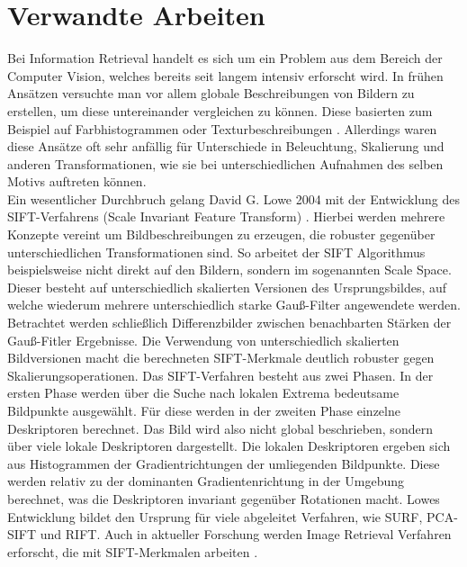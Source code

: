 \section*{Verwandte Arbeiten}
Bei Information Retrieval handelt es sich um ein Problem aus dem Bereich der Computer Vision, welches bereits seit langem intensiv erforscht wird. In frühen Ansätzen versuchte man vor allem globale Beschreibungen von Bildern zu erstellen, um diese untereinander vergleichen zu können. Diese basierten zum Beispiel auf Farbhistogrammen oder Texturbeschreibungen \cite{early_days}. Allerdings waren diese Ansätze oft sehr anfällig für Unterschiede in Beleuchtung, Skalierung und anderen Transformationen, wie sie bei unterschiedlichen Aufnahmen des selben Motivs auftreten können.
\\
Ein wesentlicher Durchbruch gelang David G. Lowe 2004 mit der Entwicklung des SIFT-Verfahrens (Scale Invariant Feature Transform) \cite{sift}. Hierbei werden mehrere Konzepte vereint um Bildbeschreibungen zu erzeugen, die robuster gegenüber unterschiedlichen Transformationen sind. So arbeitet der SIFT Algorithmus beispielsweise nicht direkt auf den Bildern, sondern im sogenannten Scale Space. Dieser besteht auf unterschiedlich skalierten Versionen des Ursprungsbildes, auf welche wiederum mehrere unterschiedlich starke Gauß-Filter angewendete werden. Betrachtet werden schließlich Differenzbilder zwischen benachbarten Stärken der Gauß-Fitler Ergebnisse. Die Verwendung von unterschiedlich skalierten Bildversionen macht die berechneten SIFT-Merkmale deutlich robuster gegen Skalierungsoperationen. Das SIFT-Verfahren besteht aus zwei Phasen. In der ersten Phase werden über die Suche nach lokalen Extrema bedeutsame Bildpunkte ausgewählt. Für diese werden in der zweiten Phase einzelne Deskriptoren berechnet. Das Bild wird also nicht global beschrieben, sondern über viele lokale Deskriptoren dargestellt. Die lokalen Deskriptoren ergeben sich aus Histogrammen der Gradientrichtungen der umliegenden Bildpunkte. Diese werden relativ zu der dominanten Gradientenrichtung in der Umgebung berechnet, was die Deskriptoren invariant gegenüber Rotationen macht. Lowes Entwicklung bildet den Ursprung für viele abgeleitet Verfahren, wie SURF\cite{surf}, PCA-SIFT\cite{pca_sift} und RIFT\cite{rift}. Auch in aktueller Forschung werden Image Retrieval Verfahren erforscht, die mit SIFT-Merkmalen arbeiten \cite{modern_sift_useage}. \\
